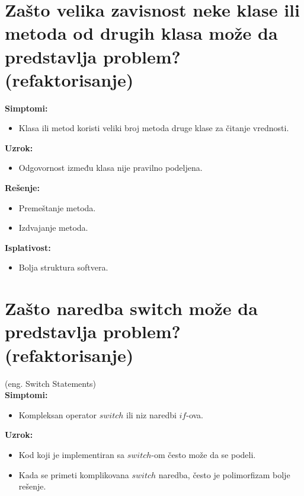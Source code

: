 \documentclass[a4paper]{article}
\begin{document}
\section{Zašto velika zavisnost neke klase ili metoda od drugih klasa može da 
         predstavlja problem? (refaktorisanje)}
  \noindent \textbf{Simptomi:}
  \begin{itemize}
    \item Klasa ili metod koristi veliki broj metoda druge klase za čitanje vrednosti.
  \end{itemize}

  \noindent \textbf{Uzrok:} 
  \begin{itemize}
    \item Odgovornost između klasa nije pravilno podeljena.
  \end{itemize}

  \noindent \textbf{Rešenje:} 
  \begin{itemize}
    \item Premeštanje metoda.
    \item Izdvajanje metoda.
  \end{itemize}

  \noindent \textbf{Isplativost:} 
  \begin{itemize}
    \item Bolja struktura softvera.
  \end{itemize}

\section{Zašto naredba switch može da predstavlja problem? (refaktorisanje)}
  (eng. Switch Statements)\\
  \textbf{Simptomi:}
  \begin{itemize}
    \item Kompleksan operator $switch$ ili niz naredbi $if$-ova.
  \end{itemize}

  \noindent \textbf{Uzrok:} 
  \begin{itemize}
    \item Kod koji je implementiran sa $switch$-om često može da se podeli. 
    \item Kada se primeti komplikovana $switch$ naredba, često je polimorfizam bolje rešenje.
  \end{itemize}
\end{document}
